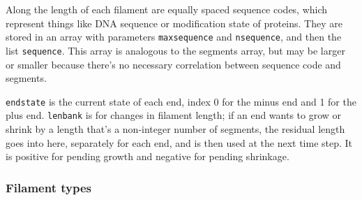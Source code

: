 \documentclass {scrbook}
\newcommand {\ttt} {\texttt}
\begin{document}
Along the length of each filament are equally spaced sequence codes, which represent things like DNA sequence or modification state of proteins. They are stored in an array with parameters \ttt{maxsequence} and \ttt{nsequence}, and then the list \ttt{sequence}. This array is analogous to the segments array, but may be larger or smaller because there's no necessary correlation between sequence code and segments.

\ttt{endstate} is the current state of each end, index 0 for the minus end and 1 for the plus end. \ttt{lenbank} is for changes in filament length; if an end wants to grow or shrink by a length that's a non-integer number of segments, the residual length goes into here, separately for each end, and is then used at the next time step. It is positive for pending growth and negative for pending shrinkage.\\

\subsubsection{Filament types}
\end{document}
